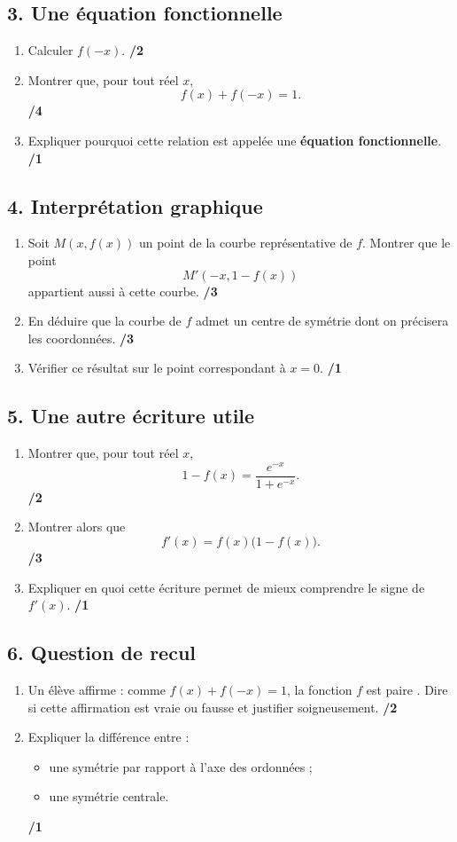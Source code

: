 \documentclass[11pt,a4paper]{article}
\begin{document}
\subsection*{3. Une équation fonctionnelle}
\begin{enumerate}
    \item Calculer \(f(-x)\). \hfill \textbf{/2}
    \item Montrer que, pour tout réel \(x\),
    \[
    f(x)+f(-x)=1.
    \]
    \hfill \textbf{/4}
    \item Expliquer pourquoi cette relation est appelée une \textbf{équation fonctionnelle}. \hfill \textbf{/1}
\end{enumerate}

\subsection*{4. Interprétation graphique}
\begin{enumerate}
    \item Soit \(M(x,f(x))\) un point de la courbe représentative de \(f\). Montrer que le point
    \[
    M'(-x,1-f(x))
    \]
    appartient aussi à cette courbe. \hfill \textbf{/3}
    \item En déduire que la courbe de \(f\) admet un centre de symétrie dont on précisera les coordonnées. \hfill \textbf{/3}
    \item Vérifier ce résultat sur le point correspondant à \(x=0\). \hfill \textbf{/1}
\end{enumerate}

\subsection*{5. Une autre écriture utile}
\begin{enumerate}
    \item Montrer que, pour tout réel \(x\),
    \[
    1-f(x)=\frac{e^{-x}}{1+e^{-x}}.
    \]
    \hfill \textbf{/2}
    \item Montrer alors que
    \[
    f'(x)=f(x)\bigl(1-f(x)\bigr).
    \]
    \hfill \textbf{/3}
    \item Expliquer en quoi cette écriture permet de mieux comprendre le signe de \(f'(x)\). \hfill \textbf{/1}
\end{enumerate}

\subsection*{6. Question de recul}
\begin{enumerate}
    \item Un élève affirme : \og comme \(f(x)+f(-x)=1\), la fonction \(f\) est paire \fg. Dire si cette affirmation est vraie ou fausse et justifier soigneusement. \hfill \textbf{/2}
    \item Expliquer la différence entre :
    \begin{itemize}
        \item une symétrie par rapport à l'axe des ordonnées ;
        \item une symétrie centrale.
    \end{itemize}
    \hfill \textbf{/1}
\end{enumerate}
\end{document}
